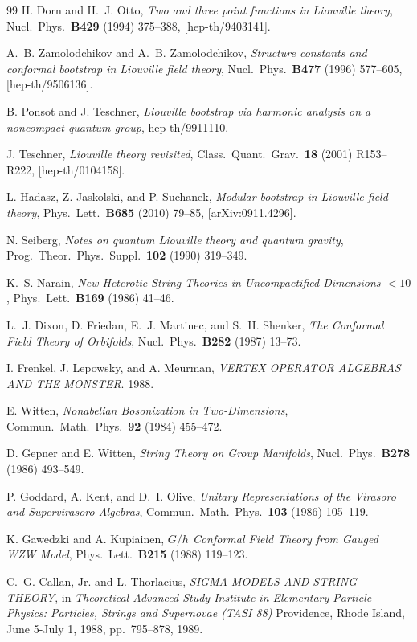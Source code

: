 \begin{thebibliography}{99}
 H. Dorn and H.~J. Otto, \emph{Two and three point functions in Liouville theory}, Nucl.\ Phys.\ \textbf{B429} (1994) 375--388, [hep-th/9403141].

 A.~B. Zamolodchikov and A.~B. Zamolodchikov, \emph{Structure constants and conformal bootstrap in Liouville field theory}, Nucl.\ Phys.\ \textbf{B477} (1996) 577--605, [hep-th/9506136].

 B. Ponsot and J. Teschner, \emph{Liouville bootstrap via harmonic analysis on a noncompact quantum group}, hep-th/9911110.

 J. Teschner, \emph{Liouville theory revisited}, Class.\ Quant.\ Grav.\ \textbf{18} (2001) R153--R222, [hep-th/0104158].

 L. Hadasz, Z. Jaskolski, and P. Suchanek, \emph{Modular bootstrap in Liouville field theory}, Phys.\ Lett.\ \textbf{B685} (2010) 79--85, [arXiv:0911.4296].

 N. Seiberg, \emph{Notes on quantum Liouville theory and quantum gravity}, Prog.\ Theor.\ Phys.\ Suppl.\ \textbf{102} (1990) 319--349.

 K.~S. Narain, \emph{New Heterotic String Theories in Uncompactified Dimensions $<10$}, Phys.\ Lett.\ \textbf{B169} (1986) 41--46.

 L.~J. Dixon, D. Friedan, E.~J. Martinec, and S.~H. Shenker, \emph{The Conformal Field Theory of Orbifolds}, Nucl.\ Phys.\ \textbf{B282} (1987) 13--73.

 I. Frenkel, J. Lepowsky, and A. Meurman, \emph{VERTEX OPERATOR ALGEBRAS AND THE MONSTER}. 1988.

 E. Witten, \emph{Nonabelian Bosonization in Two-Dimensions}, Commun.\ Math.\ Phys.\ \textbf{92} (1984) 455--472.

 D. Gepner and E. Witten, \emph{String Theory on Group Manifolds}, Nucl.\ Phys.\ \textbf{B278} (1986) 493--549.

 P. Goddard, A. Kent, and D.~I. Olive, \emph{Unitary Representations of the Virasoro and Supervirasoro Algebras}, Commun.\ Math.\ Phys.\ \textbf{103} (1986) 105--119.

 K. Gawedzki and A. Kupiainen, \emph{$G/h$ Conformal Field Theory from Gauged WZW Model}, Phys.\ Lett.\ \textbf{B215} (1988) 119--123.

 C.~G. Callan, Jr. and L. Thorlacius, \emph{SIGMA MODELS AND STRING THEORY}, in \emph{Theoretical Advanced Study Institute in Elementary Particle Physics: Particles, Strings and Supernovae (TASI 88)} Providence, Rhode Island, June 5-July 1, 1988, pp.~795--878, 1989.


\end{thebibliography}
